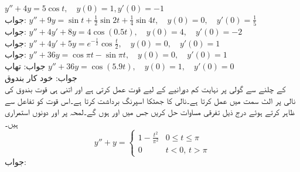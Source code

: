 \quad
$y''+4y=5\cos t,\quad y(0)=1,y'(0)=-1$\\
جواب:
\quad
$y''+9y=\sin t+\frac{1}{2}\sin 2t+\frac{1}{4}\sin 4t, \quad y(0)=0, \quad y'(0)=\frac{1}{5}$\\
جواب:
\quad
$y''+4y'+8y=4\cos( 0.5t), \quad y(0)=4, \quad y'(0)=-2$\\
جواب:
\quad
$y''+4y'+5y=e^{-\frac{t}{2}}\cos \frac{t}{2}, \quad y(0)=0, \quad y'(0)=1$\\
جواب:
\quad
$y''+36y=\cos \pi t-\sin \pi t, \quad y(0)=0, \quad y'(0)=1$\\
جواب:
\quad تھاپ \quad
$y''+36y=\cos (5.9t), \quad y(0)=1, \quad y'(0)=0$\\
جواب:
\quad خود کار بندوق \\
 کے چلنے سے گولی پر نہایت کم دورانیے کے لیے  قوت عمل کرتی ہے اور اتنی ہی قوت بندوق کی نالی پر الٹ سمت میں عمل کرتا ہے۔نالی کا جھٹکا اسپرنگ برداشت کرتا ہے۔اس قوت کو تفاعل  سے ظاہر کرتے ہوئے درج ذیل تفرقی مساوات حل کریں جس میں  اور  ہوں گے۔لمحہ  پر  اور  دونوں استمراری ہیں۔
\begin{equation*}
y''+y=
\begin{cases}
1-\frac{t^2}{\pi^2} & 0 \le t \le \pi\\
0 & t<0, \, t>\pi
\end{cases}
\end{equation*}
جواب:

